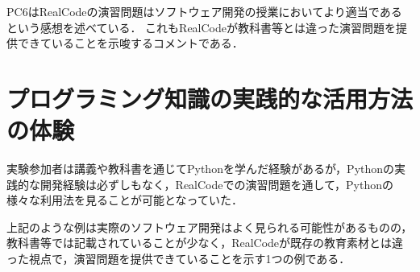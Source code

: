 PC6はRealCodeの演習問題はソフトウェア開発の授業においてより適当であるという感想を述べている．
これもRealCodeが教科書等とは違った演習問題を提供できていることを示唆するコメントである．



\section*{プログラミング知識の実践的な活用方法の体験}

実験参加者は講義や教科書を通じてPythonを学んだ経験があるが，Pythonの実践的な開発経験は必ずしもなく，RealCodeでの演習問題を通して，Pythonの様々な利用法を見ることが可能となっていた．




上記のような例は実際のソフトウェア開発はよく見られる可能性があるものの，教科書等では記載されていることが少なく，RealCodeが既存の教育素材とは違った視点で，演習問題を提供できていることを示す1つの例である．

